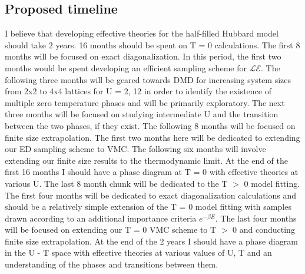 \documentclass[12pt]{article}
\begin{document}
\subsection{Proposed timeline}
I believe that developing effective theories for the half-filled Hubbard model should take 2 years. 
16 months should be spent on T = 0 calculations.
The first 8 months will be focused on exact diagonalization.
In this period, the first two months would be spent developing an efficient sampling scheme for $\mathcal{LE}$.
The following three months will be geared towards DMD for increasing system sizes from 2x2 to 4x4 lattices for U = 2, 12 in order to identify the existence of multiple zero temperature phases and will be primarily exploratory.
The next three months will be focused on studying intermediate U and the transition between the two phases, if they exist.
The following 8 months will be focused on finite size extrapolation.
The first two months here will be dedicated to extending our ED sampling scheme to VMC.
The following six months will involve extending our finite size results to the thermodynamic limit.
At the end of the first 16 months I should have a phase diagram at T = 0 with effective theories at various U.
The last 8 month chunk will be dedicated to the T $>$ 0 model fitting.
The first four months will be dedicated to exact diagonalization calculations and should be a relatively simple extension of the T = 0 model fitting with samples drawn according to an additional importance criteria $e^{-\beta E}$.
The last four months will be focused on extending our T = 0 VMC scheme to T $>$ 0 and conducting finite size extrapolation.
At the end of the 2 years I should have a phase diagram in the U - T space with effective theories at various values of U, T and an understanding of the phases and transitions between them.
\end{document}
